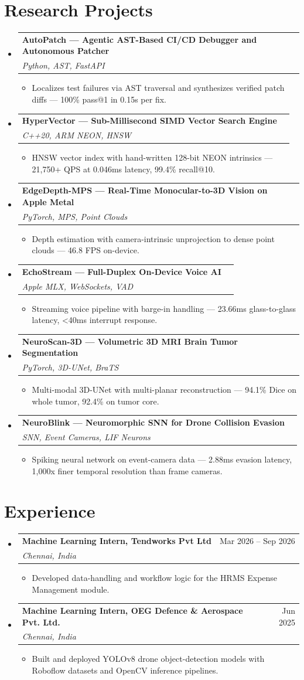 \documentclass[letterpaper,10pt]{article}
\makeatletter
\newcommand{\resumeItem}[1]{
  \item\small{#1 \vspace{-2pt}}
}
\newcommand{\resumeSubheading}[4]{
  \vspace{-2pt}\item
    \begin{tabular*}{0.98\textwidth}[t]{l@{\extracolsep{\fill}}r}
      \textbf{#1} & #2 \\
      \textit{\small#3} & \textit{\small #4} \\
    \end{tabular*}\vspace{-7pt}
}
\newcommand{\resumeSubHeadingListStart}{\begin{itemize}[leftmargin=0.0in, label={}]}
\newcommand{\resumeSubHeadingListEnd}{\end{itemize}}
\newcommand{\resumeItemListStart}{\begin{itemize}[leftmargin=*, itemsep=1pt]}
\newcommand{\resumeItemListEnd}{\end{itemize}\vspace{-5pt}}
\makeatother
\begin{document}
\section{Research Projects}
  \resumeSubHeadingListStart
    \resumeSubheading
      {AutoPatch --- Agentic AST-Based CI/CD Debugger and Autonomous Patcher}{}
      {Python, AST, FastAPI}{}
    \resumeItemListStart
      \resumeItem{Localizes test failures via AST traversal and synthesizes verified patch diffs --- 100\% pass@1 in 0.15s per fix.}
    \resumeItemListEnd
    \resumeSubheading
      {HyperVector --- Sub-Millisecond SIMD Vector Search Engine}{}
      {C++20, ARM NEON, HNSW}{}
    \resumeItemListStart
      \resumeItem{HNSW vector index with hand-written 128-bit NEON intrinsics --- 21,750+ QPS at 0.046ms latency, 99.4\% recall@10.}
    \resumeItemListEnd
    \resumeSubheading
      {EdgeDepth-MPS --- Real-Time Monocular-to-3D Vision on Apple Metal}{}
      {PyTorch, MPS, Point Clouds}{}
    \resumeItemListStart
      \resumeItem{Depth estimation with camera-intrinsic unprojection to dense point clouds --- 46.8 FPS on-device.}
    \resumeItemListEnd
    \resumeSubheading
      {EchoStream --- Full-Duplex On-Device Voice AI}{}
      {Apple MLX, WebSockets, VAD}{}
    \resumeItemListStart
      \resumeItem{Streaming voice pipeline with barge-in handling --- 23.66ms glass-to-glass latency, \textless 40ms interrupt response.}
    \resumeItemListEnd
    \resumeSubheading
      {NeuroScan-3D --- Volumetric 3D MRI Brain Tumor Segmentation}{}
      {PyTorch, 3D-UNet, BraTS}{}
    \resumeItemListStart
      \resumeItem{Multi-modal 3D-UNet with multi-planar reconstruction --- 94.1\% Dice on whole tumor, 92.4\% on tumor core.}
    \resumeItemListEnd
    \resumeSubheading
      {NeuroBlink --- Neuromorphic SNN for Drone Collision Evasion}{}
      {SNN, Event Cameras, LIF Neurons}{}
    \resumeItemListStart
      \resumeItem{Spiking neural network on event-camera data --- 2.88ms evasion latency, 1{,}000x finer temporal resolution than frame cameras.}
    \resumeItemListEnd
  \resumeSubHeadingListEnd

\section{Experience}
  \resumeSubHeadingListStart
    \resumeSubheading
      {Machine Learning Intern, Tendworks Pvt Ltd}{Mar 2026 -- Sep 2026}
      {Chennai, India}{}
    \resumeItemListStart
      \resumeItem{Developed data-handling and workflow logic for the HRMS Expense Management module.}
    \resumeItemListEnd
    \resumeSubheading
      {Machine Learning Intern, OEG Defence \& Aerospace Pvt. Ltd.}{Jun 2025}
      {Chennai, India}{}
    \resumeItemListStart
      \resumeItem{Built and deployed YOLOv8 drone object-detection models with Roboflow datasets and OpenCV inference pipelines.}
    \resumeItemListEnd
  \resumeSubHeadingListEnd
\end{document}
